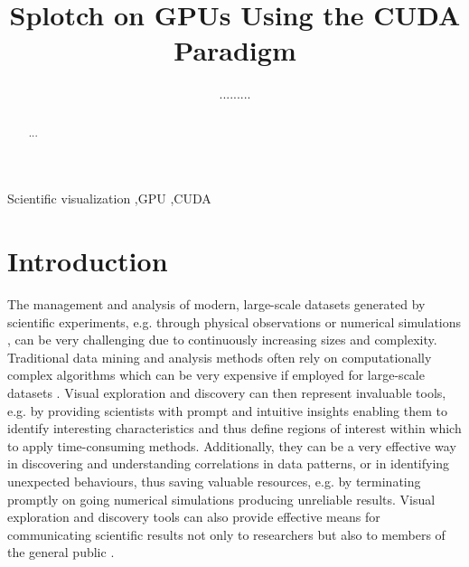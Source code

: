 \documentclass[1p]{elsarticle}
\begin{document}
\begin{frontmatter}

\title{Splotch on GPUs Using the CUDA Paradigm}
\author{.........}

\begin{abstract}
...
\end{abstract}

\begin{keyword}
Scientific visualization \sep GPU \sep CUDA
\end{keyword}

\end{frontmatter}

\section{Introduction}
\label{sec:intro}

The management and analysis of modern, large-scale datasets generated by scientific experiments, e.g. through physical observations \cite{} or numerical simulations \cite{}, can be very challenging due to continuously increasing sizes and complexity. Traditional data mining and analysis methods often rely on computationally complex
algorithms \cite{} which can be very expensive if employed for 
large-scale datasets \cite{}. Visual exploration and discovery can then represent invaluable tools, e.g. by providing scientists with prompt and intuitive insights enabling them to identify interesting characteristics and thus define regions of interest within which
to apply time-consuming methods. Additionally, they can be a very effective way in discovering and understanding correlations in data patterns, or in identifying unexpected behaviours, thus saving valuable resources, e.g. by terminating promptly on going numerical simulations producing unreliable results. Visual exploration and discovery tools can also provide effective means for communicating scientific results not only to researchers \cite{} but also to members of the general public \cite{}.
\end{document}
